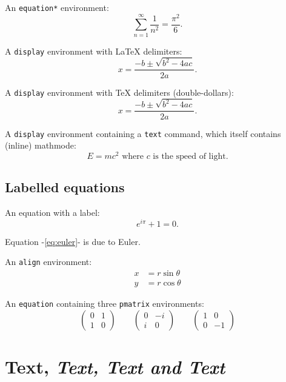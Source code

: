 \documentclass[12pt]{article}
\theoremstyle{plain}
\theoremstyle{definition}
\theoremstyle{remark}
\theoremstyle{mystyle}
\begin{document}
An \texttt{equation*} environment:
\begin{equation*}
\sum_{n=1}^{\infty}\frac{1}{n^2} = \frac{\pi^2}{6}.
\end{equation*}

A \texttt{display} environment with LaTeX delimiters:
\[
x = \frac{-b\pm\sqrt{b^2-4ac}}{2a}.
\]

A \texttt{display} environment with TeX delimiters (double-dollars):
$$
x = \frac{-b\pm\sqrt{b^2-4ac}}{2a}.
$$

A \texttt{display} environment containing a \texttt{text} command, which itself contains (inline) mathmode:
\[
E=mc^2 \text{ where $c$ is the speed of light}.
\]

\subsection{Labelled equations}


An equation with a label:
\begin{equation}\label{eq:euler}
e^{i\pi}+1=0.
\end{equation}

Equation -\eqref{eq:euler}- is due to Euler.

An \texttt{align} environment:
\begin{align}\label{eq:polar}
x & = r\sin\theta \\
y & = r\cos\theta
\end{align}


\bigskip
An {\tt equation} containing three {\tt pmatrix} environments:
\begin{equation}
\begin{pmatrix}0 & 1 \\ 1 & 0\end{pmatrix}
\qquad
\begin{pmatrix}0 & -i \\ i & 0\end{pmatrix}
\qquad
\begin{pmatrix}1 & 0 \\ 0 & -1\end{pmatrix}
\end{equation}


\section{\bf Text, \sl Text, \it Text \normalfont and \sc Text}
\end{document}
